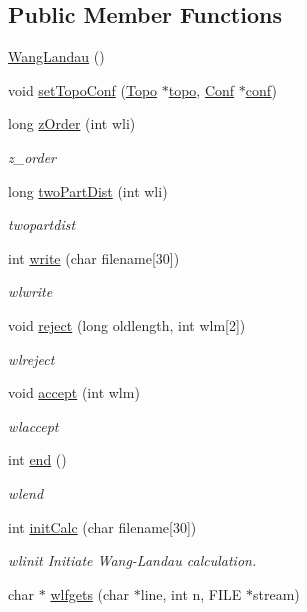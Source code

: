 \subsection*{Public Member Functions}
\begin{DoxyCompactItemize}
\item 
\hyperlink{class_wang_landau_ab53f526003716a3b44563e5d2e5bed30}{Wang\+Landau} ()
\item 
void \hyperlink{class_wang_landau_a7d5506109f6c750565616c08b726d9f9}{set\+Topo\+Conf} (\hyperlink{class_topo}{Topo} $\ast$\hyperlink{class_wang_landau_a501fc7de450a2e78e5817331ec748517}{topo}, \hyperlink{class_conf}{Conf} $\ast$\hyperlink{class_wang_landau_acffd727c52c62ecf4bb12afbef005f91}{conf})
\item 
long \hyperlink{class_wang_landau_a4df29efa3a6199173058ffd12710c7e8}{z\+Order} (int wli)
\begin{DoxyCompactList}\small\item\em z\+\_\+order \end{DoxyCompactList}\item 
long \hyperlink{class_wang_landau_a14b34abee0916008aa263444926148e5}{two\+Part\+Dist} (int wli)
\begin{DoxyCompactList}\small\item\em twopartdist \end{DoxyCompactList}\item 
int \hyperlink{class_wang_landau_aa4f3858393f8cc34e0fb3f8274c4d742}{write} (char filename\mbox{[}30\mbox{]})
\begin{DoxyCompactList}\small\item\em wlwrite \end{DoxyCompactList}\item 
void \hyperlink{class_wang_landau_a66c79a6c8c0daa072426fa49476eca2f}{reject} (long oldlength, int wlm\mbox{[}2\mbox{]})
\begin{DoxyCompactList}\small\item\em wlreject \end{DoxyCompactList}\item 
void \hyperlink{class_wang_landau_a92b05d49c04b18f80a2532ced9e1ab5e}{accept} (int wlm)
\begin{DoxyCompactList}\small\item\em wlaccept \end{DoxyCompactList}\item 
int \hyperlink{class_wang_landau_a8ae98a180e7b4558de2a284e98c36f64}{end} ()
\begin{DoxyCompactList}\small\item\em wlend \end{DoxyCompactList}\item 
int \hyperlink{class_wang_landau_a4f96f435c69135fb5597cb708cb67ed5}{init\+Calc} (char filename\mbox{[}30\mbox{]})
\begin{DoxyCompactList}\small\item\em wlinit Initiate Wang-\/\+Landau calculation. \end{DoxyCompactList}\item 
char $\ast$ \hyperlink{class_wang_landau_a94ec92068a3d35b48a3dcb49e69cfbab}{wlfgets} (char $\ast$line, int n, F\+I\+L\+E $\ast$stream)
\end{DoxyCompactItemize}
